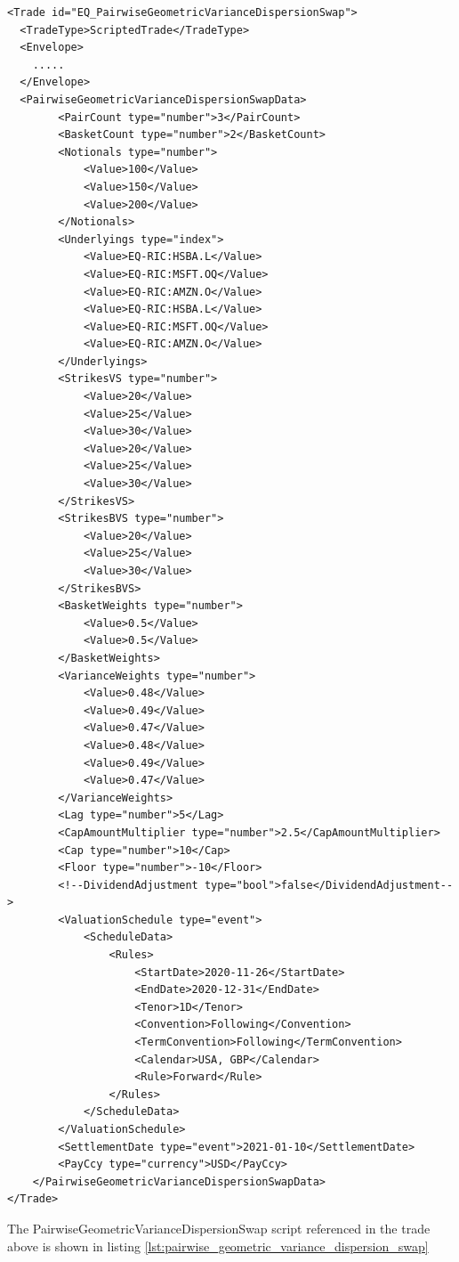 \begin{verbatim}
<Trade id="EQ_PairwiseGeometricVarianceDispersionSwap">
  <TradeType>ScriptedTrade</TradeType>
  <Envelope>
    .....
  </Envelope>
  <PairwiseGeometricVarianceDispersionSwapData>
		<PairCount type="number">3</PairCount>
		<BasketCount type="number">2</BasketCount>
		<Notionals type="number">
			<Value>100</Value>
			<Value>150</Value>
			<Value>200</Value>
		</Notionals>
		<Underlyings type="index">
			<Value>EQ-RIC:HSBA.L</Value>
			<Value>EQ-RIC:MSFT.OQ</Value>
			<Value>EQ-RIC:AMZN.O</Value>
			<Value>EQ-RIC:HSBA.L</Value>
			<Value>EQ-RIC:MSFT.OQ</Value>
			<Value>EQ-RIC:AMZN.O</Value>
		</Underlyings>
		<StrikesVS type="number">
			<Value>20</Value>
			<Value>25</Value>
			<Value>30</Value>
			<Value>20</Value>
			<Value>25</Value>
			<Value>30</Value>
		</StrikesVS>
		<StrikesBVS type="number">
			<Value>20</Value>
			<Value>25</Value>
			<Value>30</Value>
		</StrikesBVS>
		<BasketWeights type="number">
			<Value>0.5</Value>
			<Value>0.5</Value>
		</BasketWeights>
		<VarianceWeights type="number">
			<Value>0.48</Value>
			<Value>0.49</Value>
			<Value>0.47</Value>
			<Value>0.48</Value>
			<Value>0.49</Value>
			<Value>0.47</Value>
		</VarianceWeights>
		<Lag type="number">5</Lag>
		<CapAmountMultiplier type="number">2.5</CapAmountMultiplier>
		<Cap type="number">10</Cap>
		<Floor type="number">-10</Floor>
		<!--DividendAdjustment type="bool">false</DividendAdjustment-->
		<ValuationSchedule type="event">
			<ScheduleData>
				<Rules>
					<StartDate>2020-11-26</StartDate>
					<EndDate>2020-12-31</EndDate>
					<Tenor>1D</Tenor>
					<Convention>Following</Convention>
					<TermConvention>Following</TermConvention>
					<Calendar>USA, GBP</Calendar>
					<Rule>Forward</Rule>
				</Rules>
			</ScheduleData>
		</ValuationSchedule>
		<SettlementDate type="event">2021-01-10</SettlementDate>
		<PayCcy type="currency">USD</PayCcy>
	</PairwiseGeometricVarianceDispersionSwapData>
</Trade>
\end{verbatim}

The PairwiseGeometricVarianceDispersionSwap script referenced in the trade above is shown in listing
\ref{lst:pairwise_geometric_variance_dispersion_swap}

